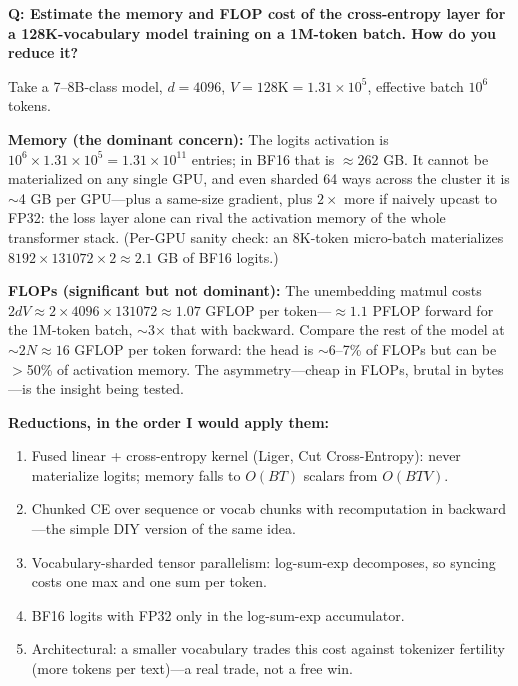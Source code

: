 \begin{interviewq}
\textbf{Q: Estimate the memory and FLOP cost of the cross-entropy layer for a 128K-vocabulary model training on a 1M-token batch. How do you reduce it?}

 \quad {} \quad \badgefreq{\freqmed}

\stronganswer Take a 7--8B-class model, $d = 4096$, $V = 128\text{K} = 1.31 \times 10^5$, effective batch $10^6$ tokens.

\textbf{Memory (the dominant concern):} The logits activation is $10^6 \times 1.31 \times 10^5 = 1.31 \times 10^{11}$ entries; in BF16 that is $\approx 262$ GB. It cannot be materialized on any single GPU, and even sharded 64 ways across the cluster it is $\sim$4 GB per GPU---plus a same-size gradient, plus $2\times$ more if naively upcast to FP32: the loss layer alone can rival the activation memory of the whole transformer stack. (Per-GPU sanity check: an 8K-token micro-batch materializes $8192 \times 131072 \times 2 \approx 2.1$ GB of BF16 logits.)

\textbf{FLOPs (significant but not dominant):} The unembedding matmul costs $2dV \approx 2 \times 4096 \times 131072 \approx 1.07$ GFLOP per token---$\approx 1.1$ PFLOP forward for the 1M-token batch, $\sim$3$\times$ that with backward. Compare the rest of the model at $\sim 2N \approx 16$ GFLOP per token forward: the head is $\sim$6--7\% of FLOPs but can be $>$50\% of activation memory. The asymmetry---cheap in FLOPs, brutal in bytes---is the insight being tested.

\textbf{Reductions, in the order I would apply them:}
\begin{enumerate}
    \item Fused linear + cross-entropy kernel (Liger, Cut Cross-Entropy): never materialize logits; memory falls to $O(BT)$ scalars from $O(BTV)$.
    \item Chunked CE over sequence or vocab chunks with recomputation in backward---the simple DIY version of the same idea.
    \item Vocabulary-sharded tensor parallelism: log-sum-exp decomposes, so syncing costs one max and one sum per token.
    \item BF16 logits with FP32 only in the log-sum-exp accumulator.
    \item Architectural: a smaller vocabulary trades this cost against tokenizer fertility (more tokens per text)---a real trade, not a free win.
\end{enumerate}


\end{interviewq}

